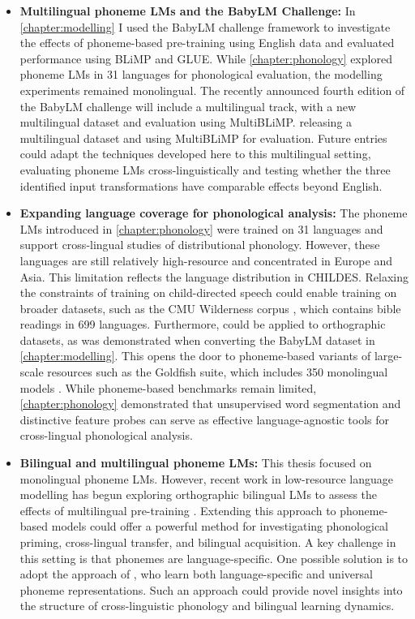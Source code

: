 \begin{itemize}
    \item \textbf{Multilingual phoneme LMs and the BabyLM Challenge:} In \cref{chapter:modelling} I used the BabyLM challenge framework to investigate the effects of phoneme-based pre-training using English data and evaluated performance using BLiMP and GLUE. While \cref{chapter:phonology} explored phoneme LMs in 31 languages for phonological evaluation, the modelling experiments remained monolingual. The recently announced fourth edition of the BabyLM challenge will include a multilingual track, with a new multilingual dataset and evaluation using MultiBLiMP. releasing a multilingual dataset and using MultiBLiMP for evaluation. Future entries could adapt the techniques developed here to this multilingual setting, evaluating phoneme LMs cross-linguistically and testing whether the three identified input transformations have comparable effects beyond English.
    \item \textbf{Expanding language coverage for phonological analysis:} The phoneme LMs introduced in \cref{chapter:phonology} were trained on 31 languages and support cross-lingual studies of distributional phonology. However, these languages are still relatively high-resource and concentrated in Europe and Asia. This limitation reflects the language distribution in CHILDES. Relaxing the constraints of training on child-directed speech could enable training on broader datasets, such as the CMU Wilderness corpus \citep{8683536}, which contains bible readings in 699 languages. Furthermore, \gpp could be applied to orthographic datasets, as was demonstrated when converting the BabyLM dataset in \cref{chapter:modelling}. This opens the door to phoneme-based variants of large-scale resources such as the Goldfish suite, which includes 350 monolingual models \citep{chang2024goldfish}. While phoneme-based benchmarks remain limited, \cref{chapter:phonology} demonstrated that unsupervised word segmentation and distinctive feature probes can serve as effective language-agnostic tools for cross-lingual phonological analysis.
    \item \textbf{Bilingual and multilingual phoneme LMs:} This thesis focused on monolingual phoneme LMs. However, recent work in low-resource language modelling has begun exploring orthographic bilingual LMs to assess the effects of multilingual pre-training \citep{arnett2025acquisition}. Extending this approach to phoneme-based models could offer a powerful method for investigating phonological priming, cross-lingual transfer, and bilingual acquisition. A key challenge in this setting is that phonemes are language-specific. One possible solution is to adopt the approach of \citet{li2020universal}, who learn both language-specific and universal phoneme representations. Such an approach could provide novel insights into the structure of cross-linguistic phonology and bilingual learning dynamics.

\end{itemize}
